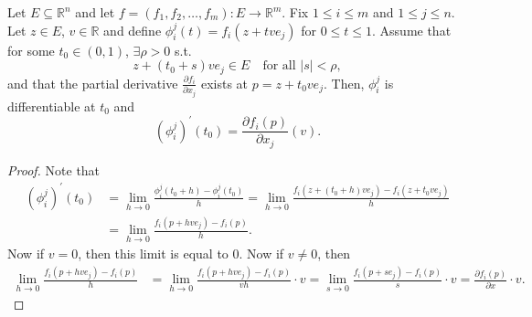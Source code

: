 \begin{lemma} \label{lm: chain rule}
    Let \(E \subseteq \mathbb{R} ^n\) and let \(f = (f_1, f_2, \dots , f_m) : E \to \mathbb{R} ^m\). Fix \(1 \le i \le m\) and \(1 \le j \le n\). Let \(z \in E\), \(v \in \mathbb{R} \) and define \(\phi _i^j (t) = f_i (z + t v e_j)\) for \(0 \le t \le 1\). Assume that for some \(t_0 \in (0, 1)\), \(\exists \rho > 0\) s.t. 
    \[
        z + (t_0 + s)v e_j \in E \quad \text{for all } \vert s \vert < \rho,  
    \]
    and that the partial derivative \(\frac{\partial f_i}{\partial x_j} \) exists at \(p = z + t_0 v e_j\). Then, \(\phi _i^j\) is differentiable at \(t_0\) and 
    \[
        \left( \phi _i^j \right)^{\prime} (t_0) = \frac{\partial f_i(p)}{\partial x_j}(v).  
    \]              
\end{lemma}
\begin{proof}
    Note that 
    \begin{align*}
        \left( \phi _i^j \right)^{\prime}(t_0) &= \lim_{h \to 0} \frac{\phi _i^j(t_0 + h) - \phi _i^j (t_0) }{h} = \lim_{h \to 0} \frac{f_i(z + (t_0 + h)ve_j) - f_i(z + t_0 v e_j)}{h} \\
        &= \lim_{h \to 0} \frac{f_i(p + hve_j) - f_i(p)}{h}.  
    \end{align*}
    Now if \(v = 0\), then this limit is equal to \(0\). Now if \(v \neq 0\), then 
    \begin{align*}
        \lim_{h \to 0} \frac{f_i(p + hve_j) - f_i(p)}{h} &= \lim_{h \to 0} \frac{f_i(p + hve_j) - f_i(p)}{vh} \cdot v = \lim_{s \to 0} \frac{f_i(p + se_j) - f_i(p)}{s} \cdot v = \frac{\partial f_i(p)}{\partial x} \cdot v.   
    \end{align*}  
\end{proof}

